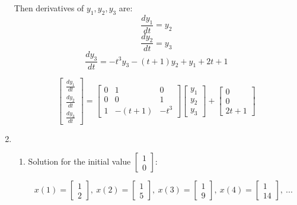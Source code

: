\documentclass[12pt,a4paper, margin=1in]{article}
\newcommand\ddfrac[2]{\frac{\displaystyle #1}{\displaystyle #2}}
\begin{document}
\begin{enumerate}
        Then derivatives of $y_1, y_2, y_3$ are:
        \begin{equation*}
            \frac{dy_1}{dt} = y_2
        \end{equation*}
        \begin{equation*}
            \frac{dy_2}{dt}  = y_3
        \end{equation*}
        \begin{equation*}
            \frac{dy_3}{dt} = -t^3y_3 -(t+1)y_2 + y_1 + 2t +1
        \end{equation*}
        
        \bigskip

        \begin{equation*}
            \begin{bmatrix}
                \ddfrac{dy_1}{dt} \\[8pt] \ddfrac{dy_2}{dt} \\[8pt] \ddfrac{dy_3}{dt}  
            \end{bmatrix} = \begin{bmatrix}
                0 & 1 & 0 \\
                0 & 0 & 1 \\
                1 & -(t+1) & -t^3
            \end{bmatrix} \begin{bmatrix}
                y_1 \\ y_2 \\ y_3
            \end{bmatrix} + \begin{bmatrix}
                0 \\ 0 \\ 2t + 1
            \end{bmatrix}
        \end{equation*}
    \item %
        \begin{enumerate}
            \item Solution for the initial value $\begin{bmatrix}
                    1 \\ 0
                \end{bmatrix}$:

                \begin{equation*}
                    x(1) = \begin{bmatrix}1 \\ 2\end{bmatrix},\
                    x(2) = \begin{bmatrix}1 \\ 5\end{bmatrix},\
                    x(3) = \begin{bmatrix}1 \\ 9\end{bmatrix},\
                    x(4) = \begin{bmatrix}1 \\ 14\end{bmatrix}, \ ...
                \end{equation*}


\end{enumerate}
\end{enumerate}
\end{document}

